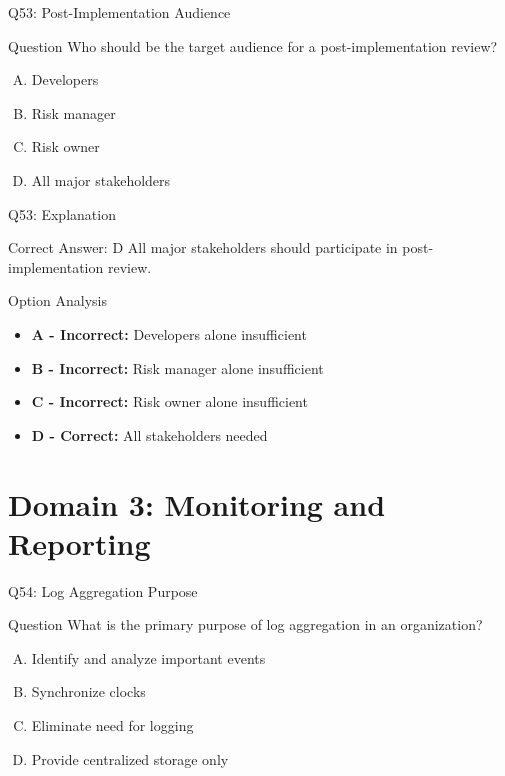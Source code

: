 \documentclass{beamer}
\begin{document}
	\begin{frame}{Q53: Post-Implementation Audience}
		\begin{block}{Question}
			Who should be the target audience for a post-implementation review?
		\end{block}
		\begin{enumerate}[(A)]
			\item Developers
			\item Risk manager
			\item Risk owner
			\item All major stakeholders
		\end{enumerate}
	\end{frame}
	
	\begin{frame}{Q53: Explanation}
		\begin{block}{Correct Answer: D}
			All major stakeholders should participate in post-implementation review.
		\end{block}
		\begin{block}{Option Analysis}
			\begin{itemize}
				\item \textbf{A - Incorrect:} Developers alone insufficient
				\item \textbf{B - Incorrect:} Risk manager alone insufficient
				\item \textbf{C - Incorrect:} Risk owner alone insufficient
				\item \textbf{D - Correct:} All stakeholders needed
			\end{itemize}
		\end{block}
	\end{frame}
	
	\section{Domain 3: Monitoring and Reporting}
	
	\begin{frame}{Q54: Log Aggregation Purpose}
		\begin{block}{Question}
			What is the primary purpose of log aggregation in an organization?
		\end{block}
		\begin{enumerate}[(A)]
			\item Identify and analyze important events
			\item Synchronize clocks
			\item Eliminate need for logging
			\item Provide centralized storage only
		\end{enumerate}
	\end{frame}
	
\end{document}
